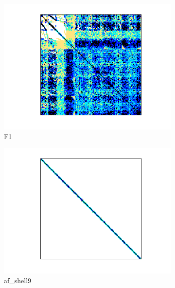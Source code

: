 \begin{figure}[H]
\begin{subfigure}[b]{0.3\textwidth}
        \includegraphics[width=\textwidth]{./images/CG/F1.png}
        \caption{F1}
    \end{subfigure}
    \quad 
    \begin{subfigure}[b]{0.3\textwidth}
        \includegraphics[width=\textwidth]{./images/CG/af_shell9.png}
        \caption{af\_shell9}
    \end{subfigure}
    \quad 
    \begin{subfigure}[b]{0.3\textwidth}

\end{subfigure}
\end{figure}
